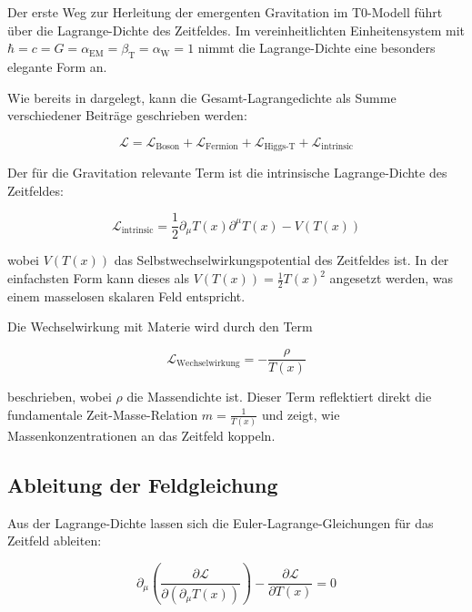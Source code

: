 \documentclass[12pt,a4paper]{article}
\newcommand{\Tfield}{T(x)}
\newcommand{\betaT}{\beta_{\text{T}}}
\newcommand{\alphaEM}{\alpha_{\text{EM}}}
\newcommand{\alphaW}{\alpha_{\text{W}}}
\begin{document}
	Der erste Weg zur Herleitung der emergenten Gravitation im T0-Modell führt über die Lagrange-Dichte des Zeitfeldes. Im vereinheitlichten Einheitensystem mit \(\hbar = c = G = \alphaEM = \betaT = \alphaW = 1\) nimmt die Lagrange-Dichte eine besonders elegante Form an.
	
	Wie bereits in \cite{pascher_messdifferenzen_2025} dargelegt, kann die Gesamt-Lagrangedichte als Summe verschiedener Beiträge geschrieben werden:
	
	\begin{equation}
		\mathcal{L} = \mathcal{L}_{\text{Boson}} + \mathcal{L}_{\text{Fermion}} + \mathcal{L}_{\text{Higgs-T}} + \mathcal{L}_{\text{intrinsic}}
	\end{equation}
	
	Der für die Gravitation relevante Term ist die intrinsische Lagrange-Dichte des Zeitfeldes:
	
	\begin{equation}
		\mathcal{L}_{\text{intrinsic}} = \frac{1}{2} \partial_\mu \Tfield \partial^\mu \Tfield - V(\Tfield)
	\end{equation}
	
	wobei \(V(\Tfield)\) das Selbstwechselwirkungspotential des Zeitfeldes ist. In der einfachsten Form kann dieses als \(V(\Tfield) = \frac{1}{2} \Tfield^2\) angesetzt werden, was einem masselosen skalaren Feld entspricht.
	
	Die Wechselwirkung mit Materie wird durch den Term
	
	\begin{equation}
		\mathcal{L}_{\text{Wechselwirkung}} = -\frac{\rho}{\Tfield}
	\end{equation}
	
	beschrieben, wobei \(\rho\) die Massendichte ist. Dieser Term reflektiert direkt die fundamentale Zeit-Masse-Relation \(m = \frac{1}{\Tfield}\) und zeigt, wie Massenkonzentrationen an das Zeitfeld koppeln.
	

	\subsection{Ableitung der Feldgleichung}
	
	Aus der Lagrange-Dichte lassen sich die Euler-Lagrange-Gleichungen für das Zeitfeld ableiten:
	
	\begin{equation}
		\partial_\mu \left( \frac{\partial \mathcal{L}}{\partial(\partial_\mu \Tfield)} \right) - \frac{\partial \mathcal{L}}{\partial \Tfield} = 0
	\end{equation}
	
\end{document}
